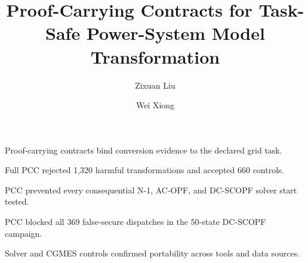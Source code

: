 \documentclass[preprint,12pt]{elsarticle}
\begin{document}
\begin{frontmatter}

\title{Proof-Carrying Contracts for Task-Safe Power-System Model Transformation}

\author[aff1]{Zixuan Liu}
\author[aff2,aff3]{Wei Xiong}

\begin{highlights}
\item Proof-carrying contracts bind conversion evidence to the declared grid task.
\item Full PCC rejected 1,320 harmful transformations and accepted 660 controls.
\item PCC prevented every consequential N-1, AC-OPF, and DC-SCOPF solver start tested.
\item PCC blocked all 369 false-secure dispatches in the 50-state DC-SCOPF campaign.
\item Solver and CGMES controls confirmed portability across tools and data sources.
\end{highlights}


\end{frontmatter}
\end{document}
